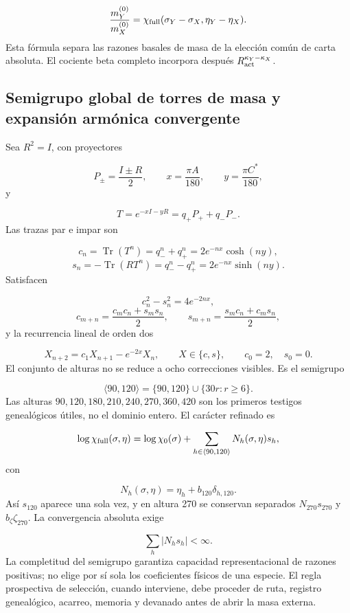 \[
\frac{m_Y^{(0)}}{m_X^{(0)}}
=\chi_{\rm full}(\sigma_Y-\sigma_X,\eta_Y-\eta_X).
\]
Esta fórmula separa las razones basales de masa de la elección común de carta absoluta. El cociente beta completo incorpora después \(R_{\rm act}^{\kappa_Y-\kappa_X}\).

\subsection{Semigrupo global de torres de masa y expansión armónica convergente}
Sea \(R^2=I\), con proyectores

\[
P_\pm=\frac{I\pm R}{2},
\qquad
x=\frac{\pi A}{180},
\qquad
y=\frac{\pi C^*}{180},
\]
y

\[
T=e^{-xI-yR}=q_+P_++q_-P_-.
\]
Las trazas par e impar son

\[
c_n=\operatorname{Tr}(T^n)=q_-^n+q_+^n
=2e^{-nx}\cosh(ny),
\]
\[
s_n=-\operatorname{Tr}(RT^n)=q_-^n-q_+^n
=2e^{-nx}\sinh(ny).
\]
Satisfacen

\[
c_n^2-s_n^2=4e^{-2nx},
\]
\[
c_{m+n}=\frac{c_mc_n+s_ms_n}{2},
\qquad
s_{m+n}=\frac{s_mc_n+c_ms_n}{2},
\]
y la recurrencia lineal de orden dos

\[
X_{n+2}=c_1X_{n+1}-e^{-2x}X_n,
\qquad X\in\{c,s\},
\qquad c_0=2,\quad s_0=0.
\]
El conjunto de alturas no se reduce a ocho correcciones visibles. Es el semigrupo

\[
\langle90,120\rangle
=\{90,120\}\cup\{30r:r\ge6\}.
\]
Las alturas \(90,120,180,210,240,270,360,420\) son los primeros testigos genealógicos útiles, no el dominio entero. El carácter refinado es

\[
\log\chi_{\rm full}(\sigma,\eta)
=\log\chi_0(\sigma)
+\sum_{h\in\langle90,120\rangle}N_h(\sigma,\eta)s_h,
\]
con

\[
N_h(\sigma,\eta)=\eta_h+b_{120}\delta_{h,120}.
\]
Así \(s_{120}\) aparece una sola vez, y en altura 270 se conservan separados \(N_{270}s_{270}\) y \(b_\zeta\zeta_{270}\). La convergencia absoluta exige

\[
\sum_h |N_hs_h|<\infty.
\]
La completitud del semigrupo garantiza capacidad representacional de razones positivas; no elige por sí sola los coeficientes físicos de una especie. El regla prospectiva de selección, cuando interviene, debe proceder de ruta, registro genealógico, acarreo, memoria y devanado antes de abrir la masa externa.

